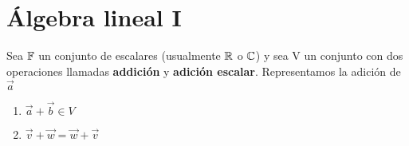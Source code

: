 \chapter{Álgebra lineal I} %
\label{cha:algebra_lineal_i}

\begin{definition}
	Sea \(\mathbb{F}\) un conjunto de escalares (usualmente \(\mathbb{R}\) o \(\mathbb{C}\)) y sea V un
	conjunto con dos operaciones llamadas \textbf{addición} y \textbf{adición
	escalar}. Representamos la adición de \(\vec{a}\)

	\begin{enumerate}
		\item \(\vec{a} + \vec{b} \in V\)
		\item \(\vec{v} + \vec{w} = \vec{w} + \vec{v}\)
	\end{enumerate}
	
\end{definition}


